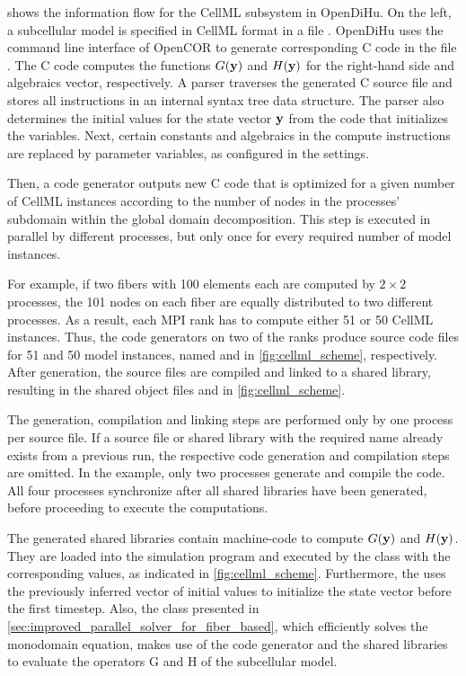  shows the information flow for the CellML subsystem in OpenDiHu. On the left, a subcellular model is specified in CellML format in a file . OpenDiHu uses the command line interface of OpenCOR to generate corresponding C code in the file . The C code computes the functions $G(\textbf{y})$ and $H(\textbf{y})$ for the right-hand side and algebraics vector, respectively. A parser traverses the generated C source file and stores all instructions in an internal syntax tree data structure. The parser also determines the initial values for the state vector $\textbf{y}$ from the code that initializes the variables.
Next, certain constants and algebraics in the compute instructions are replaced by parameter variables, as configured in the settings.

Then, a code generator outputs new C code that is optimized for a given number of CellML instances according to the number of nodes in the processes' subdomain within the global domain decomposition. 
This step is executed in parallel by different processes, but only once for every required number of model instances.

For example, if two fibers with 100 elements each are computed by $2 \times 2$ processes, the 101 nodes on each fiber are equally distributed to two different processes. As a result, each MPI rank has to compute either 51 or 50 CellML instances. Thus, the code generators on two of the ranks produce source code files for 51 and 50 model instances, named  and  in \cref{fig:cellml_scheme}, respectively. After generation, the source files are compiled and linked to a shared library, resulting in the shared object files  and  in \cref{fig:cellml_scheme}.

The generation, compilation and linking steps are performed only by one process per source file.
If a source file or shared library with the required name already exists from a previous run, the respective code generation and compilation steps are omitted.
In the example, only two processes generate and compile the code. All four processes synchronize after all shared libraries have been generated, before proceeding to execute the computations.

The generated shared libraries contain machine-code to compute $G(\textbf{y})$ and $H(\textbf{y})$. They are loaded into the simulation program and executed by the  class with the corresponding values, as indicated in \cref{fig:cellml_scheme}. Furthermore, the  uses the previously inferred vector of initial values to initialize the state vector before the first timestep. Also, the  class presented in \cref{sec:improved_parallel_solver_for_fiber_based}, which efficiently solves the monodomain equation, makes use of the code generator and the shared libraries to evaluate the operators G and H of the subcellular model.

